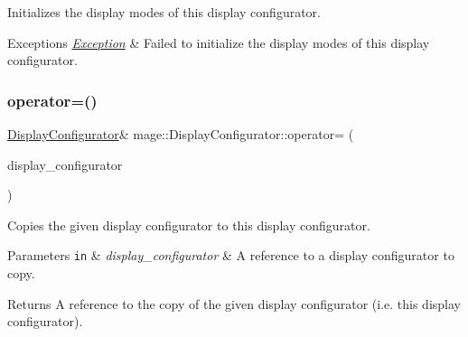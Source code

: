 Initializes the display modes of this display configurator.


\begin{DoxyExceptions}{Exceptions}
{\em \hyperlink{classmage_1_1_exception}{Exception}} & Failed to initialize the display modes of this display configurator. \\
\hline
\end{DoxyExceptions}
\hypertarget{classmage_1_1_display_configurator_adf24194f83a0971a1c3076c1a23d1699}{}\label{classmage_1_1_display_configurator_adf24194f83a0971a1c3076c1a23d1699} 
\subsubsection{\texorpdfstring{operator=()}{operator=()}\hspace{0.1cm}{\footnotesize\ttfamily [1/2]}}
{\footnotesize\ttfamily \hyperlink{classmage_1_1_display_configurator}{Display\+Configurator}\& mage\+::\+Display\+Configurator\+::operator= (\begin{DoxyParamCaption}\item[{const \hyperlink{classmage_1_1_display_configurator}{Display\+Configurator} \&}]{display\+\_\+configurator }\end{DoxyParamCaption})\hspace{0.3cm}{\ttfamily [delete]}}

Copies the given display configurator to this display configurator.


\begin{DoxyParams}[1]{Parameters}
\mbox{\tt in}  & {\em display\+\_\+configurator} & A reference to a display configurator to copy. \\
\hline
\end{DoxyParams}
\begin{DoxyReturn}{Returns}
A reference to the copy of the given display configurator (i.\+e. this display configurator). 
\end{DoxyReturn}
\hypertarget{classmage_1_1_display_configurator_a9d98a955cdbaf3bfe8913a4b561ad08d}{}\label{classmage_1_1_display_configurator_a9d98a955cdbaf3bfe8913a4b561ad08d} 
